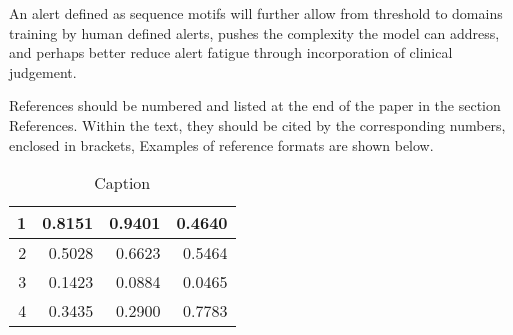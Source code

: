 \documentclass[12pt]{article}
\begin{document}
  An alert defined as sequence motifs will further allow from threshold to  domains training by human defined alerts, pushes the complexity the model can address, and perhaps better reduce alert fatigue through incorporation of clinical judgement.








References should be numbered and listed at the end of the paper in the section References.
Within the text, they should be cited by the corresponding numbers, enclosed in brackets,
Examples of reference formats are shown below.
\begin{table}[!h]
\centering
\begin{tabular}{|r|r|r|r|}
  \hline
  1 & 0.8151 & 0.9401 & 0.4640 \\   \hline
  2 & 0.5028 & 0.6623 & 0.5464 \\   \hline
  3 & 0.1423 & 0.0884 & 0.0465 \\   \hline
  4 & 0.3435 & 0.2900 & 0.7783 \\   \hline
\end{tabular}
\caption{Caption}
\end{table}



\end{document}
